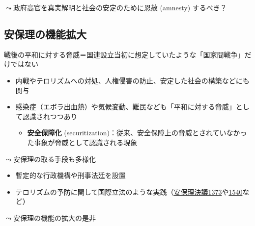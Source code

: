 \documentclass[
  xelatex,
  ja=standard]{bxjsarticle}
\providecommand{\tightlist}{%
  \setlength{\itemsep}{0pt}\setlength{\parskip}{0pt}}\usepackage{longtable,booktabs,array}
\begin{document}
\(\leadsto\)政府高官を真実解明と社会の安定のために恩赦 (amnesty)
するべき？

\hypertarget{ux5b89ux4fddux7406ux306eux6a5fux80fdux62e1ux5927}{%
\subsection{安保理の機能拡大}\label{ux5b89ux4fddux7406ux306eux6a5fux80fdux62e1ux5927}}

戦後の平和に対する脅威＝国連設立当初に想定していたような「国家間戦争」だけではない

\begin{itemize}
\tightlist
\item
  内戦やテロリズムへの対処、人権侵害の防止、安定した社会の構築などにも関与
\item
  感染症（エボラ出血熱）や気候変動、難民なども「平和に対する脅威」として認識されつつあり

  \begin{itemize}
  \tightlist
  \item
    \textbf{安全保障化}
    (securitization)：従来、安全保障上の脅威とされていなかった事象が脅威として認識される現象
  \end{itemize}
\end{itemize}

\(\leadsto\)安保理の取る手段も多様化

\begin{itemize}
\tightlist
\item
  暫定的な行政機構や刑事法廷を設置
\item
  テロリズムの予防に関して国際立法のような実践（\href{https://www.unic.or.jp/news_press/features_backgrounders/1271/}{安保理決議1373}や\href{https://www.jaea.go.jp/04/iscn/archive/pocketbook/pocketbook07-04.pdf}{1540}など）
\end{itemize}

\(\leadsto\)安保理の機能の拡大の是非


  
\end{document}
